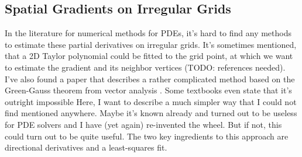 \subsection{Spatial Gradients on Irregular Grids}
In the literature for numerical methods for PDEs, it's hard to find any methods to estimate these partial derivatives on irregular grids. It's sometimes mentioned, that a 2D Taylor polynomial could be fitted to the grid point, at which we want to estimate the gradient and its neighbor vertices (TODO: references needed). I've also found a paper that describes a rather complicated method based on the Green-Gauss theorem from vector analysis \cite{Xu}. Some textbooks even state that it's outright impossible \cite{Munz} Here, I want to describe a much simpler way that I could not find mentioned anywhere. Maybe it's known already and turned out to be useless for PDE solvers and I have (yet again) re-invented the wheel. But if not, this could turn out to be quite useful. The two key ingredients to this approach are directional derivatives and a least-squares fit.

